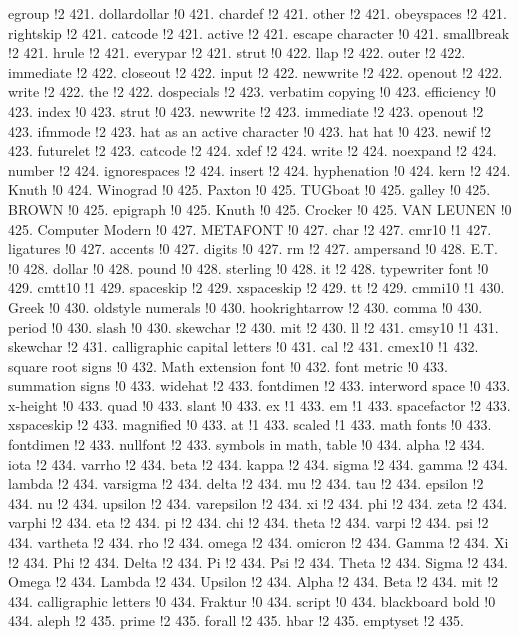 egroup !2 421.
dollardollar !0 421.
chardef !2 421.
other !2 421.
obeyspaces !2 421.
rightskip !2 421.
catcode !2 421.
active !2 421.
escape character !0 421.
smallbreak !2 421.
hrule !2 421.
everypar !2 421.
strut !0 422.
llap !2 422.
outer !2 422.
immediate !2 422.
closeout !2 422.
input !2 422.
newwrite !2 422.
openout !2 422.
write !2 422.
the !2 422.
dospecials !2 423.
verbatim copying !0 423.
efficiency !0 423.
index !0 423.
strut !0 423.
newwrite !2 423.
immediate !2 423.
openout !2 423.
ifmmode !2 423.
hat as an active character !0 423.
hat hat !0 423.
newif !2 423.
futurelet !2 423.
catcode !2 424.
xdef !2 424.
write !2 424.
noexpand !2 424.
number !2 424.
ignorespaces !2 424.
insert !2 424.
hyphenation !0 424.
kern !2 424.
Knuth !0 424.
Winograd !0 425.
Paxton !0 425.
TUGboat !0 425.
galley !0 425.
BROWN !0 425.
epigraph !0 425.
Knuth !0 425.
Crocker !0 425.
VAN LEUNEN !0 425.
Computer Modern !0 427.
METAFONT !0 427.
char !2 427.
cmr10 !1 427.
ligatures !0 427.
accents !0 427.
digits !0 427.
rm !2 427.
ampersand !0 428.
E.T. !0 428.
dollar !0 428.
pound !0 428.
sterling !0 428.
it !2 428.
typewriter font !0 429.
cmtt10 !1 429.
spaceskip !2 429.
xspaceskip !2 429.
tt !2 429.
cmmi10 !1 430.
Greek !0 430.
oldstyle numerals !0 430.
hookrightarrow !2 430.
comma !0 430.
period !0 430.
slash !0 430.
skewchar !2 430.
mit !2 430.
ll !2 431.
cmsy10 !1 431.
skewchar !2 431.
calligraphic capital letters !0 431.
cal !2 431.
cmex10 !1 432.
square root signs !0 432.
Math extension font !0 432.
font metric !0 433.
summation signs !0 433.
widehat !2 433.
fontdimen !2 433.
interword space !0 433.
x-height !0 433.
quad !0 433.
slant !0 433.
ex !1 433.
em !1 433.
spacefactor !2 433.
xspaceskip !2 433.
magnified !0 433.
at !1 433.
scaled !1 433.
math fonts !0 433.
fontdimen !2 433.
nullfont !2 433.
symbols in math, table !0 434.
alpha !2 434.
iota !2 434.
varrho !2 434.
beta !2 434.
kappa !2 434.
sigma !2 434.
gamma !2 434.
lambda !2 434.
varsigma !2 434.
delta !2 434.
mu !2 434.
tau !2 434.
epsilon !2 434.
nu !2 434.
upsilon !2 434.
varepsilon !2 434.
xi !2 434.
phi !2 434.
zeta !2 434.
varphi !2 434.
eta !2 434.
pi !2 434.
chi !2 434.
theta !2 434.
varpi !2 434.
psi !2 434.
vartheta !2 434.
rho !2 434.
omega !2 434.
omicron !2 434.
Gamma !2 434.
Xi !2 434.
Phi !2 434.
Delta !2 434.
Pi !2 434.
Psi !2 434.
Theta !2 434.
Sigma !2 434.
Omega !2 434.
Lambda !2 434.
Upsilon !2 434.
Alpha !2 434.
Beta !2 434.
mit !2 434.
calligraphic letters !0 434.
Fraktur !0 434.
script !0 434.
blackboard bold !0 434.
aleph !2 435.
prime !2 435.
forall !2 435.
hbar !2 435.
emptyset !2 435.
